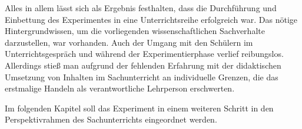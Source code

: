 Alles in allem lässt sich als Ergebnis festhalten, dass die Durchführung und Einbettung des Experimentes in eine Unterrichtsreihe erfolgreich war.
Das nötige Hintergrundwissen, um die vorliegenden wissenschaftlichen Sachverhalte darzustellen, war vorhanden.
Auch der Umgang mit den Schülern im Unterrichtsgespräch und während der Experimentierphase verlief reibungslos.
Allerdings stieß man aufgrund der fehlenden Erfahrung mit der didaktischen Umsetzung von Inhalten im Sachunterricht an individuelle Grenzen, die das erstmalige Handeln als verantwortliche Lehrperson erschwerten.

Im folgenden Kapitel soll das Experiment in einem weiteren Schritt in den Perspektivrahmen des Sachunterrichts eingeordnet werden.
